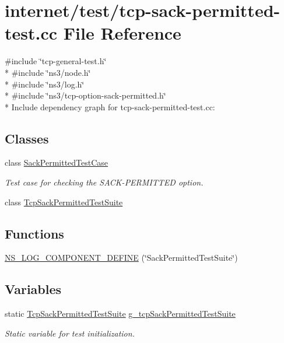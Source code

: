 \hypertarget{tcp-sack-permitted-test_8cc}{}\section{internet/test/tcp-\/sack-\/permitted-\/test.cc File Reference}
\label{tcp-sack-permitted-test_8cc}
{\ttfamily \#include \char`\"{}tcp-\/general-\/test.\+h\char`\"{}}\\*
{\ttfamily \#include \char`\"{}ns3/node.\+h\char`\"{}}\\*
{\ttfamily \#include \char`\"{}ns3/log.\+h\char`\"{}}\\*
{\ttfamily \#include \char`\"{}ns3/tcp-\/option-\/sack-\/permitted.\+h\char`\"{}}\\*
Include dependency graph for tcp-\/sack-\/permitted-\/test.cc\+:
\subsection*{Classes}
\begin{DoxyCompactItemize}
\item 
class \hyperlink{classSackPermittedTestCase}{Sack\+Permitted\+Test\+Case}
\begin{DoxyCompactList}\small\item\em Test case for checking the S\+A\+C\+K-\/\+P\+E\+R\+M\+I\+T\+T\+ED option. \end{DoxyCompactList}\item 
class \hyperlink{classTcpSackPermittedTestSuite}{Tcp\+Sack\+Permitted\+Test\+Suite}
\end{DoxyCompactItemize}
\subsection*{Functions}
\begin{DoxyCompactItemize}
\item 
\hyperlink{tcp-sack-permitted-test_8cc_a169921a65e293fd1f097472f2885aed1}{N\+S\+\_\+\+L\+O\+G\+\_\+\+C\+O\+M\+P\+O\+N\+E\+N\+T\+\_\+\+D\+E\+F\+I\+NE} (\char`\"{}Sack\+Permitted\+Test\+Suite\char`\"{})
\end{DoxyCompactItemize}
\subsection*{Variables}
\begin{DoxyCompactItemize}
\item 
static \hyperlink{classTcpSackPermittedTestSuite}{Tcp\+Sack\+Permitted\+Test\+Suite} \hyperlink{tcp-sack-permitted-test_8cc_a142c538338f673e49be878c1685b5117}{g\+\_\+tcp\+Sack\+Permitted\+Test\+Suite}
\begin{DoxyCompactList}\small\item\em Static variable for test initialization. \end{DoxyCompactList}\end{DoxyCompactItemize}


